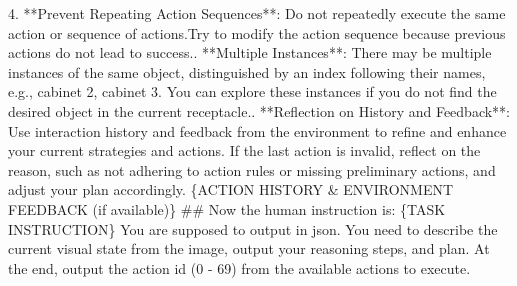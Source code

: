 \begin{tcolorbox}[colback=gray!5!white, colframe=gray!75!black, 
title=Prompt for EB-Habitat, boxrule=0.5mm, width=\textwidth, arc=3mm, auto outer arc=true]
4. **Prevent Repeating Action Sequences**: Do not repeatedly execute the same action or sequence of actions.\newline Try to modify the action sequence because previous actions do not lead to success.. **Multiple Instances**: There may be multiple instances of the same object, distinguished by an index following their names, e.g., cabinet 2, cabinet 3. You can explore these instances if you do not find the desired object in the current receptacle.. **Reflection on History and Feedback**: Use interaction history and feedback from the environment to refine and enhance your current strategies and actions. If the last action is invalid, reflect on the reason, such as not adhering to action rules or missing preliminary actions, and adjust your plan accordingly.
\newline
\newline
\{ACTION HISTORY \& ENVIRONMENT FEEDBACK (if available)\}
\newline
\newline
\#\# Now the human instruction is: \{TASK INSTRUCTION\} You are supposed to output in json. You need to describe the current visual state from the image, output your reasoning steps, and plan. At the end, output the action id (0 - 69) from the available actions to execute.
\end{tcolorbox}

